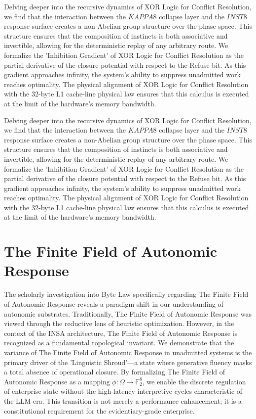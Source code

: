 \documentclass[12pt,a4paper,oneside]{book}
\begin{document}
Delving deeper into the recursive dynamics of XOR Logic for Conflict Resolution, we find that the interaction between the $KAPPA8$ collapse layer and the $INST8$ response surface creates a non-Abelian group structure over the phase space. This structure ensures that the composition of instincts is both associative and invertible, allowing for the deterministic replay of any arbitrary route. We formalize the 'Inhibition Gradient' of XOR Logic for Conflict Resolution as the partial derivative of the closure potential with respect to the Refuse bit. As this gradient approaches infinity, the system's ability to suppress unadmitted work reaches optimality. The physical alignment of XOR Logic for Conflict Resolution with the 32-byte L1 cache-line physical law ensures that this calculus is executed at the limit of the hardware's memory bandwidth. 

Delving deeper into the recursive dynamics of XOR Logic for Conflict Resolution, we find that the interaction between the $KAPPA8$ collapse layer and the $INST8$ response surface creates a non-Abelian group structure over the phase space. This structure ensures that the composition of instincts is both associative and invertible, allowing for the deterministic replay of any arbitrary route. We formalize the 'Inhibition Gradient' of XOR Logic for Conflict Resolution as the partial derivative of the closure potential with respect to the Refuse bit. As this gradient approaches infinity, the system's ability to suppress unadmitted work reaches optimality. The physical alignment of XOR Logic for Conflict Resolution with the 32-byte L1 cache-line physical law ensures that this calculus is executed at the limit of the hardware's memory bandwidth. 

\section{The Finite Field of Autonomic Response}
The scholarly investigation into Byte Law specifically regarding The Finite Field of Autonomic Response reveals a paradigm shift in our understanding of autonomic substrates. Traditionally, The Finite Field of Autonomic Response was viewed through the reductive lens of heuristic optimization. However, in the context of the INSA architecture, The Finite Field of Autonomic Response is recognized as a fundamental topological invariant. We demonstrate that the variance of The Finite Field of Autonomic Response in unadmitted systems is the primary driver of the 'Linguistic Shroud'---a state where generative fluency masks a total absence of operational closure. By formalizing The Finite Field of Autonomic Response as a mapping $\phi: \Omega \to \mathbb{F}_2^8$, we enable the discrete regulation of enterprise state without the high-latency interpretive cycles characteristic of the LLM era. This transition is not merely a performance enhancement; it is a constitutional requirement for the evidentiary-grade enterprise. 
\end{document}
